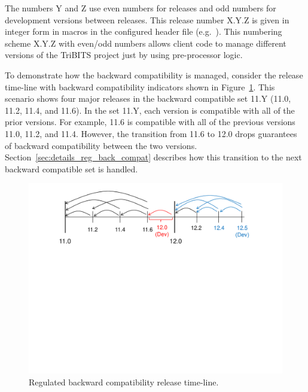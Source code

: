 \documentclass[11pt]{SANDreport}
\begin{document}
The numbers Y and Z use even numbers for releases and odd numbers for
development versions between releases.  This release number X.Y.Z is
given in integer form in macros in the configured header file
{} (e.g.\ {}).
This numbering scheme X.Y.Z with even/odd numbers allows client code
to manage different versions of the TriBITS project just by using
pre-processor logic.

To demonstrate how the backward compatibility is managed, consider the
release time-line with backward compatibility indicators shown in
Figure~\ref{fig:BackwardCompatibilityTimeline}.  This scenario shows
four major releases in the backward compatible set 11.Y (11.0, 11.2,
11.4, and 11.6).  In the set 11.Y, each version is compatible with all
of the prior versions.  For example, 11.6 is compatible with all of
the previous versions 11.0, 11.2, and 11.4.  However, the transition
from 11.6 to 12.0 drops guarantees of backward compatibility between
the two versions.  Section~\ref{sec:details_reg_back_compat} describes
how this transition to the next backward compatible set is handled.

\begin{figure}
\begin{center}
\includegraphics[trim = 1.0in 5.0in 1.0in 0.2in, scale=0.55]
{BackwardCompatibilityTimeline}
{}\caption{Regulated backward compatibility release time-line.}
\label{fig:BackwardCompatibilityTimeline}
\end{center}
\end{figure}
\end{document}
